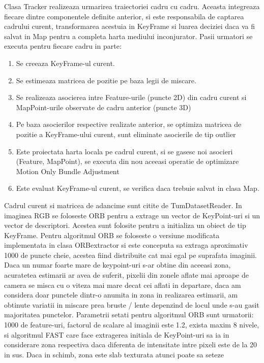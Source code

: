 \documentclass[12pt,a4paper]{report}
\begin{document}
Clasa Tracker realizeaza urmarirea traiectoriei cadru cu cadru. Aceasta integreaza 
fiecare dintre componentele definite anterior, si este responsabila de captarea cadrului curent,
transformarea acestuia in KeyFrame si luarea deciziei daca va fi salvat in Map pentru a completa 
harta mediului inconjurator. Pasii urmatori se executa pentru fiecare cadru in parte:
\begin{enumerate}
    \item Se creeaza KeyFrame-ul curent.
    \item Se estimeaza matricea de pozitie pe baza legii de miscare.
    \item Se realizeaza asocierea intre Feature-urile (puncte 2D) din cadru curent si 
MapPoint-urile observate de cadru anterior (puncte 3D)
    \item Pe baza asocierilor respective realizate anterior, se optimiza matricea de pozitie
a KeyFrame-ului curent, sunt eliminate asocierile de tip outlier
    \item Este proiectata harta locala pe cadrul curent, si se gasesc noi asocieri 
(Feature, MapPoint), se executa din nou aceeasi operatie de optimizare Motion Only Bundle Adjustment
    \item Este evaluat KeyFrame-ul curent, se verifica daca trebuie salvat in clasa Map. 
\end{enumerate}
Cadrul curent si matricea de adancime sunt citite de TumDatasetReader. In imaginea RGB 
se foloseste ORB pentru a extrage un vector de KeyPoint-uri si un vector de descriptori. 
Acestea sunt folosite pentru a initializa un obiect de tip KeyFrame. Pentru algoritmul ORB se 
foloseste o versiune modificata implementata in clasa ORBextractor si este conceputa sa extraga 
aproximativ 1000 de puncte cheie, acestea fiind distribuite cat mai egal pe suprafata imaginii. 
Daca un numar foarte mare de keypoint-uri s-ar obtine din aceeasi zona, acuratetea estimarii ar 
avea de suferit, pixelii din zonele aflate mai aproape de camera se misca cu o viteza mai mare 
decat cei aflati in departare, daca am considera doar punctele dintr-o anumita in zona in realizarea
estimarii, am obtinute variatii in miscare prea bruste / lente depenzind de locul unde s-au gasit 
majoritatea punctelor.  Parametrii setati pentru algoritmul ORB sunt urmatorii: 1000 de feature-uri,
factorul de scalare al imaginii este 1.2, exista maxim 8 nivele, si algoritmul FAST care face 
extragerea initiala de KeyPoint-uri sa ia in considerare zona respectiva daca diferenta de intensitate
intre pixeli este de la 20 in sus. Daca in schimb, zona este slab texturata atunci poate sa seteze
\end{document}
